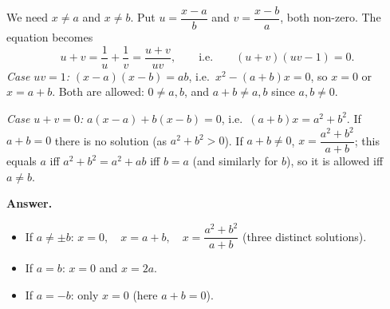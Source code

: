 We need $x\ne a$ and $x\ne b$. Put $u=\dfrac{x-a}{b}$ and $v=\dfrac{x-b}{a}$, both non-zero. The equation becomes
\[
u+v=\dfrac{1}{u}+\dfrac{1}{v}=\dfrac{u+v}{uv},\qquad\text{i.e.}\qquad (u+v)(uv-1)=0 .
\]
\emph{Case $uv=1$:} $(x-a)(x-b)=ab$, i.e.\ $x^2-(a+b)x=0$, so $x=0$ or $x=a+b$. Both are allowed: $0\ne a,b$, and $a+b\ne a,b$ since $a,b\ne0$.

\emph{Case $u+v=0$:} $a(x-a)+b(x-b)=0$, i.e.\ $(a+b)x=a^2+b^2$. If $a+b=0$ there is no solution (as $a^2+b^2>0$). If $a+b\ne0$, $x=\dfrac{a^2+b^2}{a+b}$; this equals $a$ iff $a^2+b^2=a^2+ab$ iff $b=a$ (and similarly for $b$), so it is allowed iff $a\ne b$.

\textbf{Answer.}
\begin{itemize}
\item If $a\ne\pm b$: $\boxed{x=0,\quad x=a+b,\quad x=\dfrac{a^2+b^2}{a+b}}$ (three distinct solutions).
\item If $a=b$: $x=0$ and $x=2a$.
\item If $a=-b$: only $x=0$ (here $a+b=0$).
\end{itemize}
